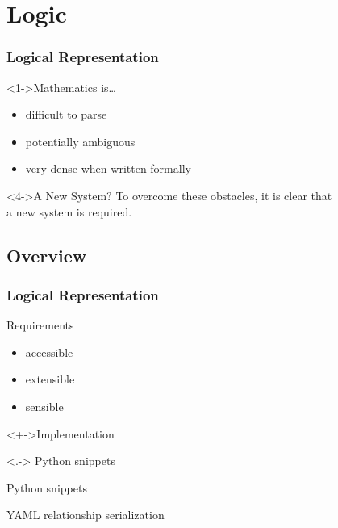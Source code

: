 \documentclass{beamer}
\begin{document}
\section{Logic}
\ifTOC\frame{\tableofcontents[currentsection]}\fi
\begin{frame}
  \frametitle{Logical Representation}
  \begin{block}<1->{Mathematics is\dots}
    \begin{itemize}
    \item<1-> difficult to parse
    \item<2-> potentially ambiguous
    \item<3-> very dense when written formally
    \end{itemize}
  \end{block}
  \begin{block}<4->{A New System?}
    To overcome these obstacles, it is clear that \\ a new system is required.
  \end{block}
\end{frame}

\subsection{Overview}
\begin{frame}
  \frametitle{Logical Representation}
  \begin{block}{Requirements}
    \begin{itemize}[<+->]
    \item accessible
    \item extensible
    \item sensible
    \end{itemize}
  \end{block}
  \begin{block}<+->{Implementation}
    \begin{description}[<+->]
    \item[predicates]<.-> Python snippets
    \item[moves] Python snippets
    \item[algorithms] YAML relationship serialization
    \end{description}
  \end{block}
\end{frame}
\end{document}
